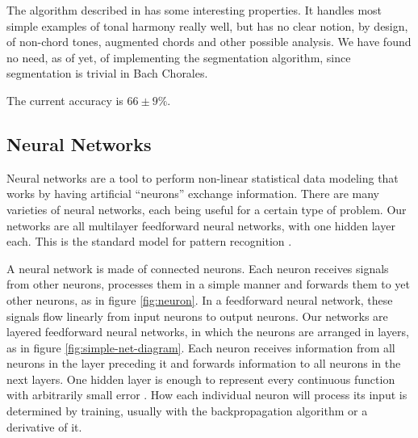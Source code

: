 \documentclass{article}
\begin{document}
The algorithm described in \cite{pardo99:automated} has some
interesting properties. It handles most simple examples of tonal
harmony really well, but has no clear notion, by design, of non-chord
tones, augmented chords and other possible analysis. We
have found no need, as of yet, of implementing the segmentation
algorithm, since segmentation is trivial in Bach Chorales.

The current accuracy is $66 \pm 9\%$.


\subsection{Neural Networks}
\label{sec:neural-nets}

Neural networks are a tool to perform non-linear statistical data
modeling that works by having artificial ``neurons'' exchange
information. There are many varieties of neural networks, each being
useful for a certain type of problem. Our networks are all multilayer
feedforward neural networks, with one hidden layer each. This is the
standard model for pattern recognition \cite{russell02:aima}.

A neural network is made of connected neurons. Each neuron receives
signals from other neurons, processes them in a simple manner and
forwards them to yet other neurons, as in figure \ref{fig:neuron}. In
a feedforward neural network, these signals flow linearly from input
neurons to output neurons. Our networks are layered feedforward neural
networks, in which the neurons are arranged in layers, as in figure
\ref{fig:simple-net-diagram}. Each neuron receives information from
all neurons in the layer preceding it and forwards information to all
neurons in the next layers. One hidden layer is enough to represent
every continuous function with arbitrarily small error
\cite{russell02:aima}. How each individual neuron will process its
input is determined by training, usually with the backpropagation
algorithm or a derivative of it.
\end{document}
